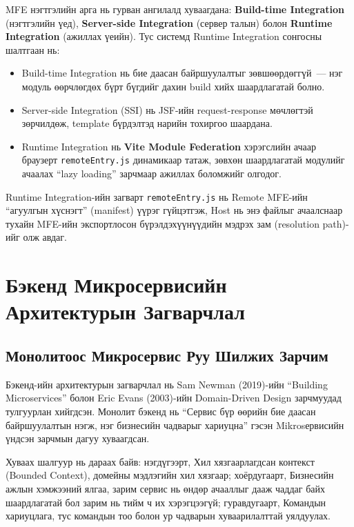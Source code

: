 MFE нэгтгэлийн арга нь гурван ангилалд хуваагдана: \textbf{Build-time
Integration} (нэгтгэлийн үед), \textbf{Server-side Integration} (сервер
талын) болон \textbf{Runtime Integration} (ажиллах үеийн). Тус
системд Runtime Integration сонгосны шалтгаан нь:

\begin{itemize}
  \item Build-time Integration нь бие даасан байршуулалтыг зөвшөөрдөггүй~---
    нэг модуль өөрчлөгдөх бүрт бүгдийг дахин build хийх шаардлагатай болно.
  \item Server-side Integration (SSI) нь JSF-ийн request-response
    мөчлөгтэй зөрчилдөж, template бүрдэлтэд нарийн тохиргоо шаардана.
  \item Runtime Integration нь \textbf{Vite Module Federation} хэрэгслийн
    ачаар браузерт \texttt{remoteEntry.js} динамикаар татаж, зөвхөн
    шаардлагатай модулийг ачаалах ``lazy loading'' зарчмаар ажиллах
    боломжийг олгодог.
\end{itemize}

Runtime Integration-ийн загварт \texttt{remoteEntry.js} нь Remote MFE-ийн
``агуулгын хүснэгт'' (manifest) үүрэг гүйцэтгэж, Host нь энэ файлыг
ачаалснаар тухайн MFE-ийн экспортлосон бүрэлдэхүүнүүдийн мэдрэх зам
(resolution path)-ийг олж авдаг.

\section{Бэкенд Микросервисийн Архитектурын Загварчлал}

\subsection{Монолитоос Микросервис Руу Шилжих Зарчим}

Бэкенд-ийн архитектурын загварчлал нь Sam Newman (2019)-ийн
``Building Microservices'' болон Eric Evans (2003)-ийн Domain-Driven
Design зарчмуудад тулгуурлан хийгдсэн. Монолит бэкенд нь ``Сервис бүр
өөрийн бие даасан байршуулалтын нэгж, нэг бизнесийн чадварыг хариуцна''
гэсэн Mikrosервисийн үндсэн зарчмын дагуу хуваагдсан.

Хуваах шалгуур нь дараах байв: нэгдүгээрт,
Хил хязгаарлагдсан контекст (Bounded Context), домейны мэдлэгийн
хил хязгаар; хоёрдугаарт, Бизнесийн ажлын хэмжээний ялгаа, зарим
сервис нь өндөр ачааллыг дааж чаддаг байх шаардлагатай бол зарим нь
тийм ч их хэрэгцээгүй; гуравдугаарт, Командын хариуцлага, тус
командын тоо болон ур чадварын хуваарилалттай уялдуулах.


